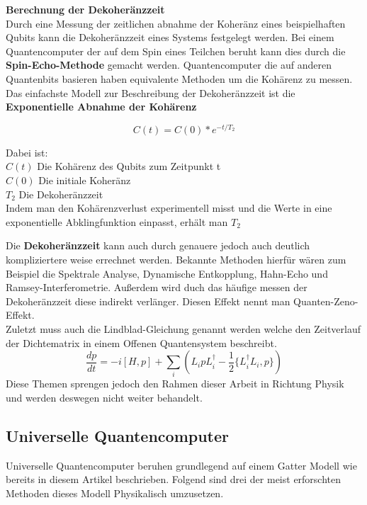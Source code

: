 \textbf{Berechnung der Dekoheränzzeit}\\
Durch eine Messung der zeitlichen abnahme der Koheränz eines beispielhaften Qubits kann die Dekoheränzzeit eines Systems festgelegt werden.
Bei einem Quantencomputer der auf dem Spin eines Teilchen beruht kann dies durch die \textbf{Spin-Echo-Methode} gemacht werden.
Quantencomputer die auf anderen Quantenbits basieren haben equivalente Methoden um die Kohärenz zu messen.\\

Das einfachste Modell zur Beschreibung der Dekoheränzzeit ist die \textbf{Exponentielle Abnahme der Kohärenz}

\begin{equation}
    C(t) = C(0)*e^{-t/T_2}
\end{equation}

Dabei ist:\\
$C(t)$ Die Kohärenz des Qubits zum Zeitpunkt t\\
$C(0)$ Die initiale Koheränz\\
$T_2$ Die Dekoheränzzeit\\

Indem man den Kohärenzverlust experimentell misst und die Werte in eine exponentielle Abklingfunktion einpasst, erhält man $T_2$\\

\begin{tcolorbox}[title=Kommentar,
    title filled=false,
    colback=cyan!5!white,
    colframe=cyan!75!black]
    Die \textbf{Dekoheränzzeit} kann auch durch genauere jedoch auch deutlich kompliziertere weise errechnet werden.
    Bekannte Methoden hierfür wären zum Beispiel die Spektrale Analyse, Dynamische Entkopplung, Hahn-Echo und Ramsey-Interferometrie.
    Außerdem wird duch das häufige messen der Dekoheränzzeit diese indirekt verlänger. Diesen Effekt nennt man Quanten-Zeno-Effekt.\\
    Zuletzt muss auch die Lindblad-Gleichung genannt werden welche den Zeitverlauf der Dichtematrix in einem Offenen Quantensystem beschreibt.
    \begin{equation}
        \frac{dp}{dt} = -i[H,p]+\sum_i(L_ipL^\dagger_i-\frac{1}{2}\{L^\dagger_i L_i,p\})
    \end{equation}
    Diese Themen sprengen jedoch den Rahmen dieser Arbeit in Richtung Physik und werden deswegen nicht weiter behandelt.
\end{tcolorbox}

\subsection{Universelle Quantencomputer}
\label{sub:universelle_quantencomputer}
Universelle Quantencomputer beruhen grundlegend auf einem Gatter Modell wie bereits in diesem Artikel beschrieben. Folgend sind drei der meist erforschten
Methoden dieses Modell Physikalisch umzusetzen.\\

